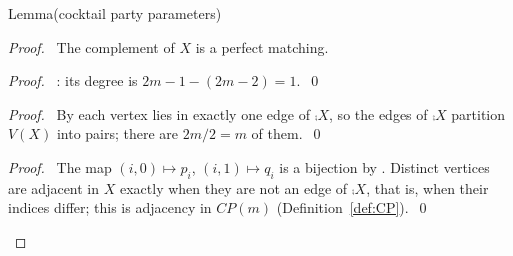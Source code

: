 \begin{namedresult}{Lemma}{(cocktail party parameters)}\label{lem:414-CP}
\end{namedresult}
\begin{proof}
 \pfsketch\ The complement of $X$ is a perfect matching.
 \begin{proof}\pf\ : its degree is
  $2m-1-(2m-2)=1$.~\qed\end{proof}
 \begin{proof}\pf\ By  each vertex lies in exactly one edge of $\comp X$, so
  the edges of $\comp X$ partition $V(X)$ into pairs; there are $2m/2=m$ of
  them.~\qed\end{proof}
 \qedstep
 \begin{proof}\pf\ The map $(i,0)\mapsto p_i$, $(i,1)\mapsto q_i$ is a bijection by
  . Distinct vertices are adjacent in $X$ exactly when they are not an edge
  of $\comp X$, that is, when their indices differ; this is adjacency in $CP(m)$
  (Definition~\ref{def:CP}).~\qed\end{proof}
\end{proof}

